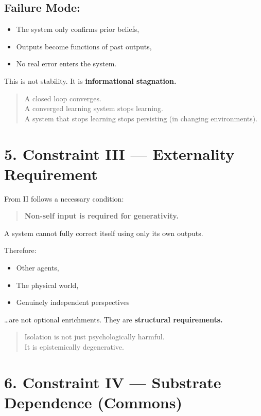 \documentclass[11pt, a4paper]{article}
\begin{document}
\subsection*{Failure Mode:}
\begin{itemize}
    \item The system only confirms prior beliefs,
    \item Outputs become functions of past outputs,
    \item No real error enters the system.
\end{itemize}

This is not stability. It is \textbf{informational stagnation.}

\begin{quote}
    A closed loop converges. \\
    A converged learning system stops learning. \\
    A system that stops learning stops persisting (in changing environments).
\end{quote}

\section*{5. Constraint III — Externality Requirement}

From II follows a necessary condition:
\begin{quote}
    \textbf{Non-self input is required for generativity.}
\end{quote}

A system cannot fully correct itself using only its own outputs.

Therefore:
\begin{itemize}
    \item Other agents,
    \item The physical world,
    \item Genuinely independent perspectives
\end{itemize}
\ldots are not optional enrichments. They are \textbf{structural requirements.}

\begin{quote}
    Isolation is not just psychologically harmful. \\
    It is epistemically degenerative.
\end{quote}

\section*{6. Constraint IV — Substrate Dependence (Commons)}
\end{document}
